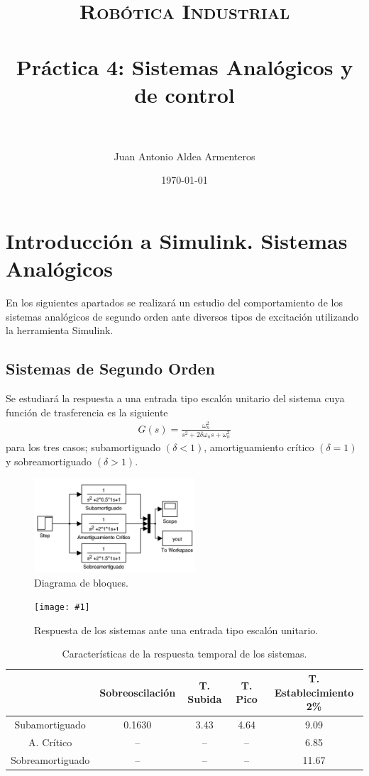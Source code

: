 \documentclass[paper=a4, fontsize=11pt]{scrreprt} %
\title{
    \normalfont \normalsize 
    \textsc{Robótica Industrial} \\ [25pt] %
    \horrule{0.5pt} \\[0.4cm] %
    \huge Práctica 4: Sistemas Analógicos y de control \\ %
    \horrule{2pt} \\[0.5cm] %
}
\author{Juan Antonio Aldea Armenteros} %
\date{\normalsize\today} %
\newlength{\imgwidth}
\newcommand\scalegraphics[1]{
    \settowidth{\imgwidth}{\texttt{[image: \#1]}}
    \setlength{\imgwidth}{\minof{\imgwidth}{\textwidth}}
    \texttt{[image: \#1]}
}
\numberwithin{equation}{section} %
\numberwithin{figure}{section} %
\numberwithin{table}{section} %
\begin{document}
    
    \maketitle %
    \chapter{Introducción a Simulink. Sistemas Analógicos}
    En los siguientes apartados se realizará un estudio del comportamiento de los sistemas analógicos de segundo orden ante diversos tipos de excitación utilizando la herramienta Simulink.
    \section{Sistemas de Segundo Orden}
    Se estudiará la respuesta a una entrada tipo escalón unitario del sistema cuya función de trasferencia es la siguiente
    \begin{align}
        G(s) = \frac{\omega_n^2}{s^2+2\delta\omega_ns+\omega_n^2}
        \label{eq:funcion_transferencia1}
    \end{align}
    para los tres casos; subamortiguado $(\delta < 1)$, amortiguamiento crítico $(\delta = 1)$ y sobreamortiguado $(\delta > 1)$.
    \begin{figure}
        \centering
        \includegraphics[width=6cm]{imagenes/simulink/simulink_sistemas_segundo_orden.png}
        \caption{Diagrama de bloques.}
    \end{figure}
    \begin{figure}
        \centering
        \scalegraphics{imagenes/respuestas/sistemas_segundo_orden_respuesta_step.png}
        \caption{Respuesta de los sistemas ante una entrada tipo escalón unitario.}
    \end{figure}
    \begin{table}[H]
        \centering
        \begin{tabular}{|c||c|c|c|c|}
            \hline
            & Sobreoscilación & T. Subida & T. Pico & T. Establecimiento 2\%\\
            \hline
            Subamortiguado & 0.1630 & 3.43 & 4.64 & 9.09\\
            \hline
            A. Crítico & -- & -- & -- & 6.85\\
            \hline
            Sobreamortiguado & -- & -- & -- & 11.67\\
            \hline
        \end{tabular}
        \caption{Características de la respuesta temporal de los sistemas.}
    \end{table}
\end{document}
